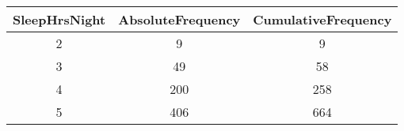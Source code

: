 \documentclass[]{book}
\theoremstyle{definition}
\theoremstyle{definition}
\theoremstyle{definition}
\theoremstyle{remark}
\begin{document}
\begin{longtable}[]{@{}ccc@{}}
\toprule
\begin{minipage}[b]{0.20\columnwidth}\centering\strut
SleepHrsNight\strut
\end{minipage} & \begin{minipage}[b]{0.25\columnwidth}\centering\strut
AbsoluteFrequency\strut
\end{minipage} & \begin{minipage}[b]{0.27\columnwidth}\centering\strut
CumulativeFrequency\strut
\end{minipage}\tabularnewline
\midrule
\endhead
\begin{minipage}[t]{0.20\columnwidth}\centering\strut
2\strut
\end{minipage} & \begin{minipage}[t]{0.25\columnwidth}\centering\strut
9\strut
\end{minipage} & \begin{minipage}[t]{0.27\columnwidth}\centering\strut
9\strut
\end{minipage}\tabularnewline
\begin{minipage}[t]{0.20\columnwidth}\centering\strut
3\strut
\end{minipage} & \begin{minipage}[t]{0.25\columnwidth}\centering\strut
49\strut
\end{minipage} & \begin{minipage}[t]{0.27\columnwidth}\centering\strut
58\strut
\end{minipage}\tabularnewline
\begin{minipage}[t]{0.20\columnwidth}\centering\strut
4\strut
\end{minipage} & \begin{minipage}[t]{0.25\columnwidth}\centering\strut
200\strut
\end{minipage} & \begin{minipage}[t]{0.27\columnwidth}\centering\strut
258\strut
\end{minipage}\tabularnewline
\begin{minipage}[t]{0.20\columnwidth}\centering\strut
5\strut
\end{minipage} & \begin{minipage}[t]{0.25\columnwidth}\centering\strut
406\strut
\end{minipage} & \begin{minipage}[t]{0.27\columnwidth}\centering\strut
664\strut
\end{minipage}\tabularnewline

\end{longtable}
\end{document}

